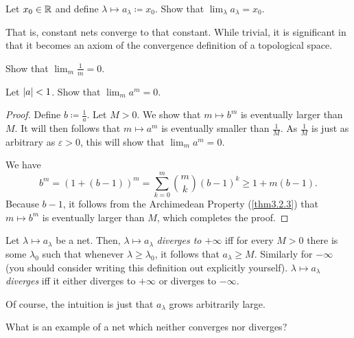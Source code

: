 \begin{exr}
Let $x_0\in \mathbb{R}$ and define $\lambda \mapsto a_\lambda \coloneqq x_0$.  Show that $\lim _\lambda a_\lambda =x_0$.
\begin{rmk}
That is, constant nets converge to that constant.  While trivial, it is significant in that it becomes an axiom of the convergence definition of a topological space.
\end{rmk}
\end{exr}
\begin{exr}
Show that $\lim _m\frac{1}{m}=0$.
\end{exr}
\begin{prp}
Let $\lvert a\rvert<1$.  Show that $\lim _ma^m=0$.
\begin{proof}
Define $b\coloneqq \frac{1}{a}$.  Let $M>0$.  We show that $m\mapsto b^m$ is eventually larger than $M$.  It will then follows that $m\mapsto a^m$ is eventually smaller than $\frac{1}{M}$.  As $\frac{1}{M}$ is just as arbitrary as $\varepsilon >0$, this will show that $\lim _ma^m=0$.

We have
\begin{equation}
b^m=(1+(b-1))^m=\sum _{k=0}^m\binom{m}{k}(b-1)^k\geq 1+m(b-1).
\end{equation}
Because $b-1$, it follows from the Archimedean Property (\cref{thm3.2.3}) that $m\mapsto b^m$ is eventually larger than $M$, which completes the proof.
\end{proof}
\end{prp}


\begin{dfn}[Divergence]
Let $\lambda \mapsto a_\lambda$ be a net.  Then, $\lambda \mapsto a_\lambda$ \emph{diverges to $+\infty$} iff for every $M>0$ there is some $\lambda _0$ such that whenever $\lambda \geq \lambda _0$, it follows that $a_\lambda \geq M$.  Similarly for $-\infty$ (you should consider writing this definition out explicitly yourself).  $\lambda \mapsto a_\lambda$ \emph{diverges} iff it either diverges to $+\infty$ or diverges to $-\infty$.
\begin{rmk}
Of course, the intuition is just that $a_\lambda$ grows arbitrarily large.
\end{rmk}
\end{dfn}
\begin{exr}
What is an example of a net which neither converges nor diverges?
\end{exr}

